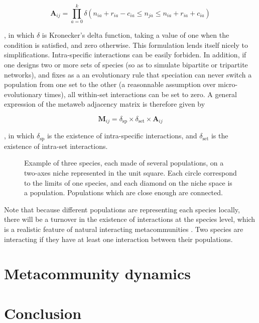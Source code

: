 \documentclass[10pt,twocolumn]{article}
\begin{document}
\begin{equation}\label{e:potential}
	\mathbf{A}_{ij} = \prod_{a=0}^k \delta\left(n_{ia}+r_{ia}-c_{ia} \leq n_{ja} \leq n_{ia}+r_{ia}+c_{ia} \right)
\end{equation}

\noindent , in which $\delta$ is Kronecker's delta function, taking a value of
one when the condition is satisfied, and zero otherwise. This formulation
lends itself nicely to simplifications. Intra-specific interactions can be
easily forbiden. In addition, if one designs two or more sets of species (so
as to simulate bipartite or tripartite networks), and fixes as a an
evolutionary rule that speciation can never switch a population from one set
to the other (a reasonnable assumption over micro-evolutionary times), all
within-set interactions can be set to zero. A general expression of the
metaweb adjacency matrix is therefore given by

\begin{equation}\label{e:realized}
	\mathbf{M}_{ij} = \delta_{\mathrm{sp}}\times\delta_{\mathrm{set}}\times\mathbf{A}_{ij}
\end{equation}

\noindent , in which $\delta_\mathrm{sp}$ is the existence of intra-specific
interactions, and $\delta_\mathrm{set}$ is the existence of intra-set
interactions.

\begin{figure}[tb]
	\centering
	
	\caption{Example of three species, each made of several populations, on a
	two-axes niche represented in the unit square. Each circle correspond to
	the limits of one species, and each diamond on the niche space is a
	population. Populations which are close enough are connected. }
   \label{f:interactions}
\end{figure}

Note that because different populations are representing each species locally,
there will be a turnover in the existence of interactions at the species
level, which is a realistic feature of natural interacting metacommunities
\parencite{PoisotELE2012}. Two species are interacting if they have at least
one interaction between their populations.

\section{Metacommunity dynamics}

\section{Conclusion}

\printbibliography
\end{document}
